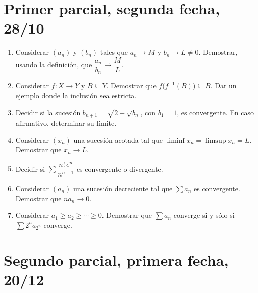 \section{Primer parcial, segunda fecha, 28/10}

\begin{enumerate}[label=(\arabic*)]
  \item Considerar \({(a_n)}\) y \({(b_n)}\) tales que \(a_n \to M\) y \(b_n \to L \neq 0\). Demostrar, usando la definición, que \(\dfrac{a_n}{b_n} \to \dfrac{M}{L}\).
  \item Considerar \(f\colon X \to Y\) y \(B \subseteq Y\). Demostrar que \(f\bigl( f^{-1}(B) \bigr) \subseteq B\). Dar un ejemplo donde la inclusión sea estricta.
  \item Decidir si la sucesión \(b_{n+1} = \sqrt{2 + \sqrt{b_n}}\), con \(b_1 = 1\), es convergente. En caso afirmativo, determinar su límite.
  \item Considerar \({(x_n)}\) una sucesión acotada tal que \(\liminf x_n = \limsup x_n = L\). Demostrar que \(x_n \to L\).
  \item Decidir si \(\sum \dfrac{n! \, e^n}{n^{n+1}}\) es convergente o divergente.
  \item Considerar \({(a_n)}\) una sucesión decreciente tal que \(\sum a_n\) es convergente. Demostrar que \(n a_n \to 0\).
  \item Considerar \(a_1 \geq a_2 \geq \cdots \geq 0\). Demostrar que \(\sum a_n\) converge si y sólo si \(\sum 2^n a_{2^n}\) converge.
\end{enumerate}

\clearpage

\section{Segundo parcial, primera fecha, 20/12}

